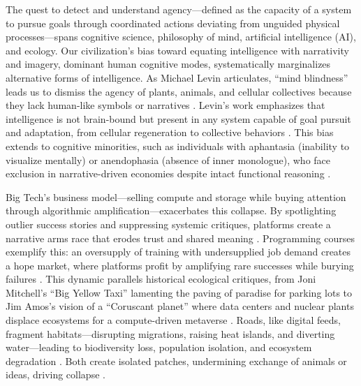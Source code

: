 \documentclass{article}
\begin{document}
The quest to detect and understand agency—defined as the capacity of a system to pursue goals through coordinated actions deviating from unguided physical processes—spans cognitive science, philosophy of mind, artificial intelligence (AI), and ecology. Our civilization’s bias toward equating intelligence with narrativity and imagery, dominant human cognitive modes, systematically marginalizes alternative forms of intelligence. As Michael Levin articulates, “mind blindness” leads us to dismiss the agency of plants, animals, and cellular collectives because they lack human-like symbols or narratives \citep{levin2022technological}. Levin's work emphasizes that intelligence is not brain-bound but present in any system capable of goal pursuit and adaptation, from cellular regeneration to collective behaviors \citep{levin2019computational}. This bias extends to cognitive minorities, such as individuals with aphantasia (inability to visualize mentally) or anendophasia (absence of inner monologue), who face exclusion in narrative-driven economies despite intact functional reasoning \citep{zeman2015, hurlburt2024}.

Big Tech’s business model—selling compute and storage while buying attention through algorithmic amplification—exacerbates this collapse. By spotlighting outlier success stories and suppressing systemic critiques, platforms create a narrative arms race that erodes trust and shared meaning \citep{zuboff2019age, wu2016attention}. Programming courses exemplify this: an oversupply of training with undersupplied job demand creates a hope market, where platforms profit by amplifying rare successes while burying failures \citep{carr2010shallows}. This dynamic parallels historical ecological critiques, from Joni Mitchell’s “Big Yellow Taxi” lamenting the paving of paradise for parking lots to Jim Amos’s vision of a “Coruscant planet” where data centers and nuclear plants displace ecosystems for a compute-driven metaverse \citep{lanham2006economics}. Roads, like digital feeds, fragment habitats—disrupting migrations, raising heat islands, and diverting water—leading to biodiversity loss, population isolation, and ecosystem degradation \citep{forman2003road}. Both create isolated patches, undermining exchange of animals or ideas, driving collapse \citep{arendt1958human}.
\end{document}

